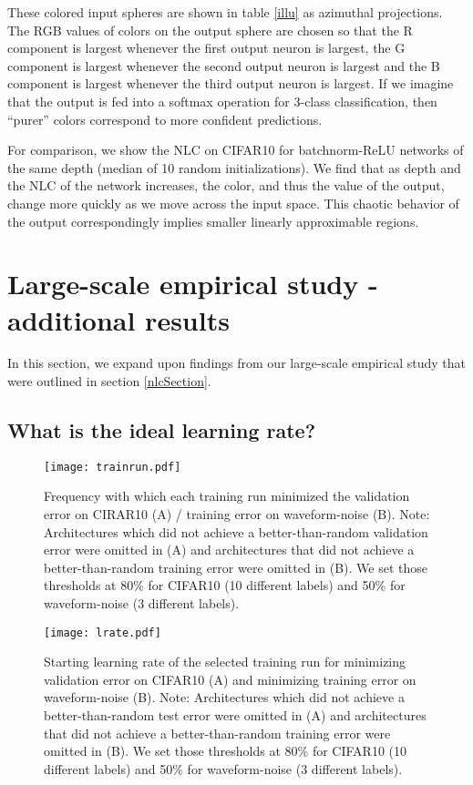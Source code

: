 \documentclass{article} %
\begin{document}
These colored input spheres are shown in table \ref{illu} as azimuthal projections. The RGB values of colors on the output sphere are chosen so that the R component is largest whenever the first output neuron is largest, the G component is largest whenever the second output neuron is largest and the B component is largest whenever the third output neuron is largest. If we imagine that the output is fed into a softmax operation for 3-class classification, then ``purer'' colors correspond to more confident predictions.

For comparison, we show the NLC on CIFAR10 for batchnorm-ReLU networks of the same depth (median of 10 random initializations). We find that as depth and the NLC of the network increases, the color, and thus the value of the output, change more quickly as we move across the input space. This chaotic behavior of the output correspondingly implies smaller linearly approximable regions.




\section{Large-scale empirical study - additional results}

In this section, we expand upon findings from our large-scale empirical study that were outlined in section \ref{nlcSection}.

\subsection{What is the ideal learning rate?} \label{lratesection}

\begin{figure*}
\texttt{[image: trainrun.pdf]}
\caption{Frequency with which each training run minimized the validation error on CIRAR10 (A) / training error on waveform-noise (B). Note: Architectures which did not achieve a better-than-random validation error were omitted in (A) and architectures that did not achieve a better-than-random training error were omitted in (B). We set those thresholds at 80\% for CIFAR10 (10 different labels) and 50\% for waveform-noise (3 different labels).}\label{trainrun}
\end{figure*}

\begin{figure*}
\texttt{[image: lrate.pdf]}
\caption{Starting learning rate of the selected training run for minimizing validation error on CIFAR10 (A) and minimizing training error on waveform-noise (B). Note: Architectures which did not achieve a better-than-random test error were omitted in (A) and architectures that did not achieve a better-than-random training error were omitted in (B). We set those thresholds at 80\% for CIFAR10 (10 different labels) and 50\% for waveform-noise (3 different labels).}\label{lrate}
\end{figure*}
\end{document}
